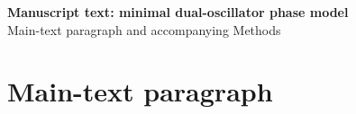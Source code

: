 \documentclass[11pt,a4paper]{article}
\begin{document}
\begin{center}
{\Large\bfseries Manuscript text: minimal dual-oscillator phase model}\\[4pt]
{\small Main-text paragraph and accompanying Methods}
\end{center}
\section*{Main-text paragraph}

\clearpage

\end{document}
